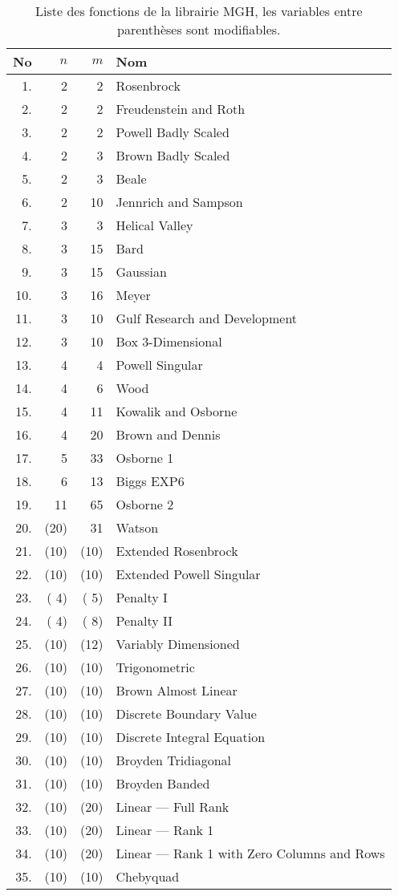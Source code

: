 {\small\center

\begin{table}[h!]
\caption{Liste des fonctions de la librairie MGH, les variables entre parenth\`eses sont modifiables.}
\center
\begin{tabular}{|r|r|r|l|}
\hline
 No & $n$ & $m$ & Nom \\
\hline
 1. &   2 &   2 &  Rosenbrock\\
 2. &   2 &   2 &  Freudenstein and Roth\\
 3. &   2 &   2 &  Powell Badly Scaled\\
 4. &   2 &   3 &  Brown Badly Scaled\\
 5. &   2 &   3 &  Beale\\
 6. &   2 &  10 &  Jennrich and Sampson\\
 7. &   3 &   3 &  Helical Valley\\
 8. &   3 &  15 &  Bard\\
 9. &   3 &  15 &  Gaussian\\
10. &   3 &  16 &  Meyer\\
11. &   3 &  10 &  Gulf Research and Development\\
12. &   3 &  10 &  Box 3-Dimensional\\
13. &   4 &   4 &  Powell Singular\\
14. &   4 &   6 &  Wood\\
15. &   4 &  11 &  Kowalik and Osborne\\
16. &   4 &  20 &  Brown and Dennis\\
17. &   5 &  33 &  Osborne 1\\
18. &   6 &  13 &  Biggs EXP6\\
19. &   11&  65 &  Osborne 2\\
20. & (20)&  31 &  Watson\\
21. & (10)& (10)&  Extended Rosenbrock\\
22. & (10)& (10)&  Extended Powell Singular\\
23. & ( 4)& ( 5)&  Penalty I\\
24. & ( 4)& ( 8)&  Penalty II\\
25. & (10)& (12)&  Variably Dimensioned\\
26. & (10)& (10)&  Trigonometric\\
27. & (10)& (10)&  Brown Almost Linear\\
28. & (10)& (10)&  Discrete Boundary Value\\
29. & (10)& (10)& Discrete Integral Equation\\
30. & (10)& (10)&  Broyden Tridiagonal\\
31. & (10)& (10)&  Broyden Banded\\
32. & (10)& (20)&  Linear --- Full Rank\\
33. & (10)& (20)&  Linear --- Rank 1\\
34. & (10)& (20)&  Linear --- Rank 1 with Zero Columns and Rows\\
35. & (10)& (10)&  Chebyquad\\
\hline
\end{tabular}
\label{tab:mgh}
\end{table}
}








